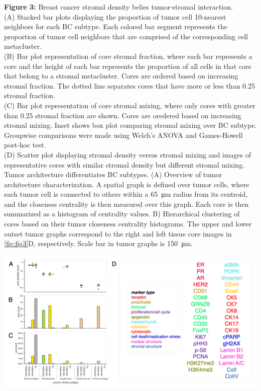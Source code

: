 \documentclass[preprint,review,3p,12pt]{elsarticle}
\begin{document}
\noindent
\textbf{Figure 3:} Breast cancer stromal density belies tumor-stromal interaction. \\
(A) Stacked bar plots displaying the proportion of tumor cell 10-nearest neighbors for each BC subtype. Each colored bar segment represents the proportion of tumor cell neighbors that are comprised of the corresponding cell metacluster. \\
(B) Bar plot representation of core stromal fraction, where each bar represents a core and the height of each bar represents the proportion of all cells in that core that belong to a stromal metacluster. Cores are ordered based on increasing stromal fraction. The dotted line separates cores that have more or less than 0.25 stromal fraction. \\
(C) Bar plot representation of core stromal mixing, where only cores with greater than 0.25 stromal fraction are shown. Cores are oredered based on increasing stromal mixing. Inset shows box plot comparing stromal mixing over BC subtype. Groupwise comparisons were made using Welch's ANOVA and Games-Howell post-hoc test. \\
(D) Scatter plot displaying stromal density versus stromal mixing and images of representative cores with similar stromal density but different stromal mixing.\\
Tumor architecture differentiates BC subtypes. (A) Overview of tumor architecture characterization. A spatial graph is defined over tumor cells, where each tumor cell is connected to others within a \SI{65}{\micro\meter} radius from its centroid, and the closeness centrality is then measured over this graph. Each core is then summarized as a histogram of centrality values. B) Hierarchical clustering of cores based on their tumor closeness centrality histograms. The upper and lower outset tumor graphs correspond to the right and left tissue core images in \autoref{fig:fig3}D, respectively. Scale bar in tumor graphs is \SI{150}{\micro\meter}.

\newpage

\begin{suppfigure}[h]
\centering\includegraphics[width=\linewidth,
                 keepaspectratio]{suppfig1}
\caption{}
\label{fig:suppfig1}
\end{suppfigure}
\end{document}
